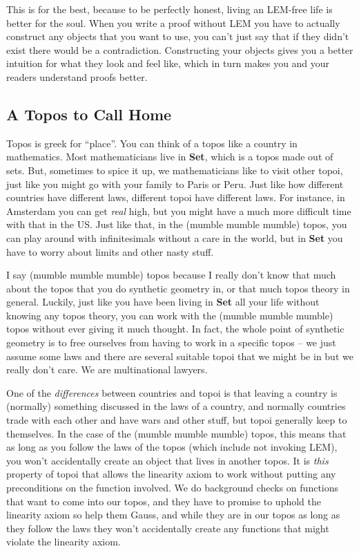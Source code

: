 \documentclass[]{book}
\begin{document}
This is for the best, because to be perfectly honest, living an LEM-free life is better for the soul. When you write a proof without LEM you have to actually construct any objects that you want to use, you can't just say that if they didn't exist there would be a contradiction.  Constructing your objects gives you a better intuition for what they look and feel like, which in turn makes you and your readers understand proofs better.

\hypertarget{a-topos-to-call-home}{%
\subsection{A Topos to Call Home}\label{a-topos-to-call-home}}

Topos is greek for ``place''. You can think of a topos like a country in mathematics. Most mathematicians live in \textbf{Set}, which is a topos made out of sets. But, sometimes to spice it up, we mathematicians like to visit other topoi, just like you might go with your family to Paris or Peru. Just like how different countries have different laws, different topoi have different laws. For instance, in Amsterdam you can get \emph{real} high, but you might have a much more difficult time with that in the US. Just like that, in the (mumble mumble mumble) topos, you can play around with infinitesimals without a care in the world, but in \textbf{Set} you have to worry about limits and other nasty stuff.

I say (mumble mumble mumble) topos because I really don't know that much about the topos that you do synthetic geometry in, or that much topos theory in general. Luckily, just like you have been living in \textbf{Set} all your life without knowing any topos theory, you can work with the (mumble mumble mumble) topos without ever giving it much thought. In fact, the whole point of synthetic geometry is to free ourselves from having to work in a specific topos -- we just assume some laws and there are several suitable topoi that we might be in but we really don't care. We are multinational lawyers.

One of the \emph{differences} between countries and topoi is that leaving a country is (normally) something discussed in the laws of a country, and normally countries trade with each other and have wars and other stuff, but topoi generally keep to themselves. In the case of the (mumble mumble mumble) topos, this means that as long as you follow the laws of the topos (which include not invoking LEM), you won't accidentally create an object that lives in another topos. It is \emph{this} property of topoi that allows the linearity axiom to work without putting any preconditions on the function involved. We do background checks on functions that want to come into our topos, and they have to promise to uphold the linearity axiom so help them Gauss, and while they are in our topos as long as they follow the laws they won't accidentally create any functions that might violate the linearity axiom.
\end{document}
